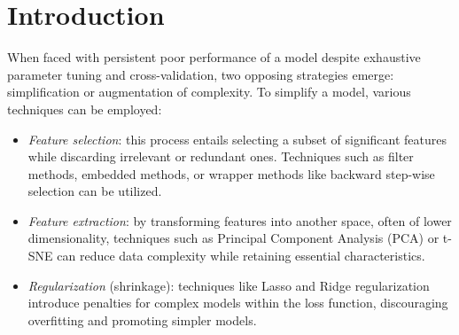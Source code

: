 \section{Introduction}

When faced with persistent poor performance of a model despite exhaustive parameter tuning and cross-validation, two opposing strategies emerge: simplification or augmentation of complexity.
To simplify a model, various techniques can be employed:
\begin{itemize}
    \item \textit{Feature selection}: this process entails selecting a subset of significant features while discarding irrelevant or redundant ones. 
        Techniques such as filter methods, embedded methods, or wrapper methods like backward step-wise selection can be utilized.
    \item \textit{Feature extraction}: by transforming features into another space, often of lower dimensionality, techniques such as Principal Component Analysis (PCA) or t-SNE can reduce data complexity while retaining essential characteristics.
    \item \textit{Regularization} (shrinkage): techniques like Lasso and Ridge regularization introduce penalties for complex models within the loss function, discouraging overfitting and promoting simpler models.
\end{itemize}